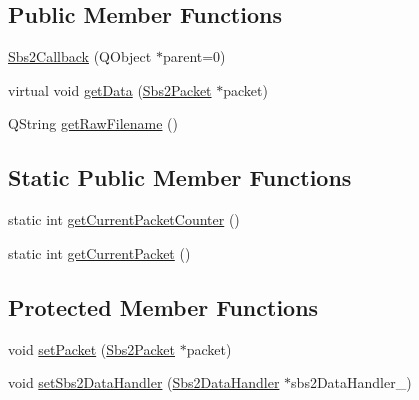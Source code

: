 \subsection*{Public Member Functions}
\begin{DoxyCompactItemize}
\item 
\hyperlink{classSbs2Callback_a98a3e60515fae31413710bb4364532e8}{Sbs2\-Callback} (Q\-Object $\ast$parent=0)
\item 
virtual void \hyperlink{classSbs2Callback_a5a8ca18e20621369676d2fc574560591}{get\-Data} (\hyperlink{classSbs2Packet}{Sbs2\-Packet} $\ast$packet)
\item 
Q\-String \hyperlink{classSbs2Callback_ae3266d38f8f2b37fd89861e7d80f1b29}{get\-Raw\-Filename} ()
\end{DoxyCompactItemize}
\subsection*{Static Public Member Functions}
\begin{DoxyCompactItemize}
\item 
static int \hyperlink{classSbs2Callback_ae3947414f7194c7f7fd7339bfaf8b482}{get\-Current\-Packet\-Counter} ()
\item 
static int \hyperlink{classSbs2Callback_abe16322e2f43f576217c4f32695cdbdf}{get\-Current\-Packet} ()
\end{DoxyCompactItemize}
\subsection*{Protected Member Functions}
\begin{DoxyCompactItemize}
\item 
void \hyperlink{classSbs2Callback_a9379f04332bd3d3715a1604a153d4ccd}{set\-Packet} (\hyperlink{classSbs2Packet}{Sbs2\-Packet} $\ast$packet)
\item 
void \hyperlink{classSbs2Callback_a3f8f597a4d8db5a417c5087aa2ccde2c}{set\-Sbs2\-Data\-Handler} (\hyperlink{classSbs2DataHandler}{Sbs2\-Data\-Handler} $\ast$sbs2\-Data\-Handler\-\_\-)
\end{DoxyCompactItemize}
